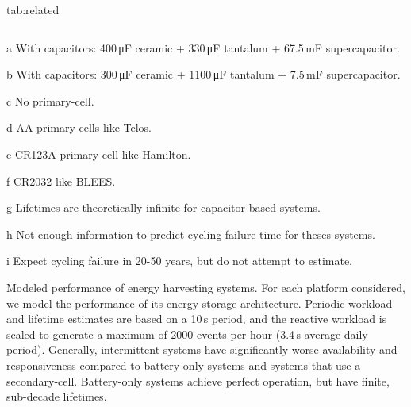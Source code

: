 \begin{definetable}{tab:related}
\begin{threeparttable}
\begin{tabular}{l | c c| c c| c}
  \end{tabular}
    \begin{tablenotes}[para]
      \item[a] With capacitors: 400\,\si{\micro\farad} ceramic + 330\,\si{\micro\farad} tantalum + 67.5\,mF supercapacitor.
      \item[b] With capacitors: 300\,\si{\micro\farad} ceramic + 1100\,\si{\micro\farad} tantalum + 7.5\,mF supercapacitor.
      \item[c] No primary-cell.
      \item[d] AA primary-cells like Telos.
      \item[e] CR123A primary-cell like Hamilton.
      \item[f] CR2032 like BLEES.
      \item[g] Lifetimes are theoretically infinite for capacitor-based systems.
      \item[h] Not enough information to predict cycling failure time for theses systems.
      \item[i] Expect cycling failure in 20-50 years, but do not attempt to estimate.
    \end{tablenotes}
  \end{threeparttable}
  \caption{
  \normalfont
      Modeled performance of energy harvesting systems.
    For each  platform considered, we model the performance of its energy storage
    architecture. Periodic workload and lifetime estimates are based on a 10\,s
    period, and the reactive workload is scaled to
    generate a maximum of 2000 events per hour (3.4\,s average daily period). Generally,
    intermittent systems have significantly worse availability and responsiveness compared to
    battery-only systems and systems that use a secondary-cell. Battery-only
    systems achieve perfect operation, but have finite, sub-decade lifetimes.
    }
\end{definetable}

